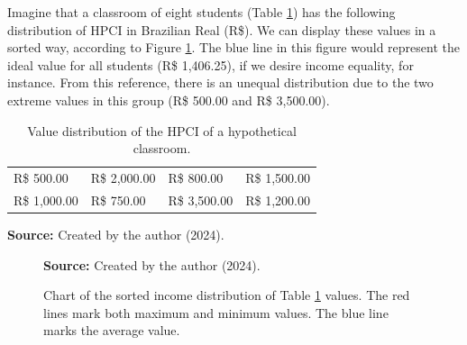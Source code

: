 Imagine that a classroom of eight students (Table \ref{tbl:classroom-dist}) has the following distribution of \gls{HPCI} in Brazilian Real (R\$). We can display these values in a sorted way, according to Figure \ref{fig:income-example}. The blue line in this figure would represent the ideal value for all students (R\$ 1,406.25), if we desire income equality, for instance. From this reference, there is an unequal distribution due to the two extreme values in this group (R\$ 500.00 and R\$ 3,500.00). 

\begin{table}[ht]
\caption{Value distribution of the HPCI of a hypothetical classroom.}
\label{tbl:classroom-dist}
\centering
{}
\begin{tabular}{
    m{2.6cm}|
    m{2.7cm}|
    m{2.5cm}|
    m{2.8cm}
}
    \hline
    R\$ 500.00 &
    R\$ 2,000.00 &
    R\$ 800.00 &
    R\$ 1,500.00 \\

    R\$ 1,000.00 &
    R\$ 750.00 &
    R\$ 3,500.00 &
    R\$ 1,200.00\\
    \hline
    
\end{tabular}

  \par\medskip\ABNTEXfontereduzida\selectfont\textbf{Source:} Created by the author (2024). \par\medskip
\end{table}

\begin{figure}[ht!]
\centering

\caption{\textmd{Chart of the sorted income distribution of Table \ref{tbl:classroom-dist} values. The red lines mark both maximum and minimum values. The blue line marks the average value.}}
\label{fig:income-example}

\par\medskip\ABNTEXfontereduzida\selectfont\textbf{Source:} Created by the author (2024).
\end{figure}

